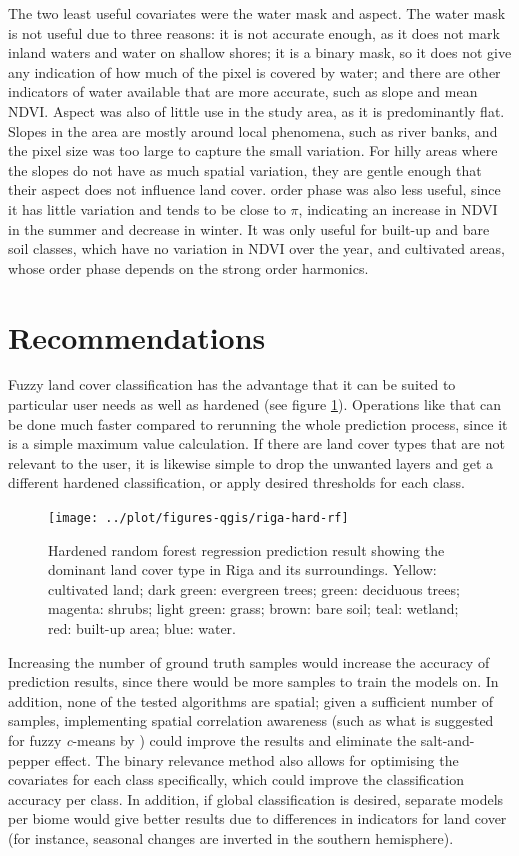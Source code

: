 \documentclass[a4paper,10pt]{book}
\begin{document}
The two least useful covariates were the water mask and aspect. The water mask is not useful due to three reasons: it is not accurate enough, as it does not mark inland waters and water on shallow shores; it is a binary mask, so it does not give any indication of how much of the pixel is covered by water; and there are other indicators of water available that are more accurate, such as slope and mean NDVI. Aspect was also of little use in the study area, as it is predominantly flat. Slopes in the area are mostly around local phenomena, such as river banks, and the pixel size was too large to capture the small variation. For hilly areas where the slopes do not have as much spatial variation, they are gentle enough that their aspect does not influence land cover.  order phase was also less useful, since it has little variation and tends to be close to $\pi{}$, indicating an increase in NDVI in the summer and decrease in winter. It was only useful for built-up and bare soil classes, which have no variation in NDVI over the year, and cultivated areas, whose  order phase depends on the strong  order harmonics.

\section{Recommendations}

Fuzzy land cover classification has the advantage that it can be suited to particular user needs as well as hardened (see figure \ref{fig-hard-rf}). Operations like that can be done much faster compared to rerunning the whole prediction process, since it is a simple maximum value calculation. If there are land cover types that are not relevant to the user, it is likewise simple to drop the unwanted layers and get a different hardened classification, or apply desired thresholds for each class.

\begin{figure}
  \centering
  \texttt{[image: ../plot/figures-qgis/riga-hard-rf]}
  \caption{Hardened random forest regression prediction result showing the dominant land cover type in Riga and its surroundings. Yellow: cultivated land; dark green: evergreen trees; green: deciduous trees; magenta: shrubs; light green: grass; brown: bare soil; teal: wetland; red: built-up area; blue: water.}
  \label{fig-hard-rf}
\end{figure}

Increasing the number of ground truth samples would increase the accuracy of prediction results, since there would be more samples to train the models on. In addition, none of the tested algorithms are spatial; given a sufficient number of samples, implementing spatial correlation awareness (such as what is suggested for fuzzy \textit{c}-means by \citet{gong2013improvedcmeans}) could improve the results and eliminate the salt-and-pepper effect. The binary relevance method also allows for optimising the covariates for each class specifically, which could improve the classification accuracy per class. In addition, if global classification is desired, separate models per biome would give better results due to differences in indicators for land cover (for instance, seasonal changes are inverted in the southern hemisphere).
\end{document}
